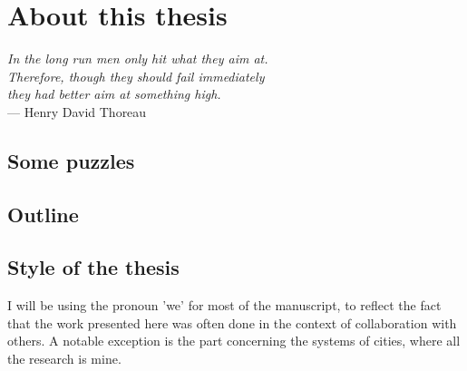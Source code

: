 

\chapter{About this thesis}
\label{chap:methodology}

\begin{flushright}{\slshape    
In the long run men only hit what they aim at.\\
Therefore, though they should fail immediately\\
they had better aim at something high.} \\ \medskip
--- Henry David Thoreau
\end{flushright}


\bigskip


\section{Some puzzles}

\section{Outline}

\section{Style of the thesis}

I will be using the pronoun 'we' for most of the manuscript, to reflect the fact
that the work presented here was often done in the context of collaboration with others. A
notable exception is the part concerning the systems of cities, where all the
research is mine.
